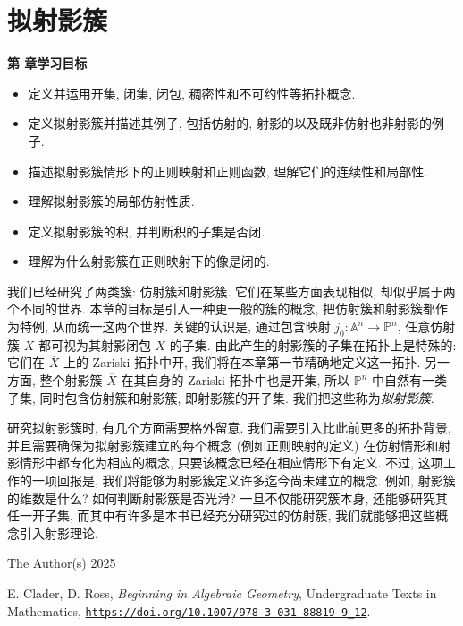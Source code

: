 \chapter{拟射影簇}\label{chap:quasiprojective-varieties}

\noindent\textbf{第 \thechapter{} 章学习目标}
\begin{itemize}
  \item 定义并运用开集, 闭集, 闭包, 稠密性和不可约性等拓扑概念.
  \item 定义拟射影簇并描述其例子, 包括仿射的, 射影的以及既非仿射也非射影的例子.
  \item 描述拟射影簇情形下的正则映射和正则函数, 理解它们的连续性和局部性.
  \item 理解拟射影簇的局部仿射性质.
  \item 定义拟射影簇的积, 并判断积的子集是否闭.
  \item 理解为什么射影簇在正则映射下的像是闭的.
\end{itemize}

我们已经研究了两类簇: 仿射簇和射影簇. 它们在某些方面表现相似, 却似乎属于两个不同的世界. 本章的目标是引入一种更一般的\textquotedbl{}簇\textquotedbl{}的概念, 把仿射簇和射影簇都作为特例, 从而统一这两个世界. 关键的认识是, 通过包含映射 $j_{0}:\mathbb{A}^{n}\to\mathbb{P}^{n}$, 任意仿射簇 $X$ 都可视为其射影闭包 $\overline{X}$ 的子集. 由此产生的射影簇的子集在拓扑上是特殊的: 它们在 $\overline{X}$ 上的 Zariski 拓扑中开, 我们将在本章第一节精确地定义这一拓扑. 另一方面, 整个射影簇 $\overline{X}$ 在其自身的 Zariski 拓扑中也是开集, 所以 $\mathbb{P}^{n}$ 中自然有一类子集, 同时包含仿射簇和射影簇, 即射影簇的开子集. 我们把这些称为\emph{拟射影簇}.

研究拟射影簇时, 有几个方面需要格外留意. 我们需要引入比此前更多的拓扑背景, 并且需要确保为拟射影簇建立的每个概念 (例如\textquotedbl{}正则映射\textquotedbl{}的定义) 在仿射情形和射影情形中都专化为相应的概念, 只要该概念已经在相应情形下有定义. 不过, 这项工作的一项回报是, 我们将能够为射影簇定义许多迄今尚未建立的概念. 例如, 射影簇的维数是什么? 如何判断射影簇是否光滑? 一旦不仅能研究簇本身, 还能够研究其任一开子集, 而其中有许多是本书已经充分研究过的仿射簇, 我们就能够把这些概念引入射影理论.

\par\smallskip
{\footnotesize
\noindent\textcopyright{} The Author(s) 2025\par
\noindent E. Clader, D. Ross, \emph{Beginning in Algebraic Geometry}, Undergraduate Texts in Mathematics,
\href{https://doi.org/10.1007/978-3-031-88819-9_12}{\nolinkurl{https://doi.org/10.1007/978-3-031-88819-9_12}}.\par}
